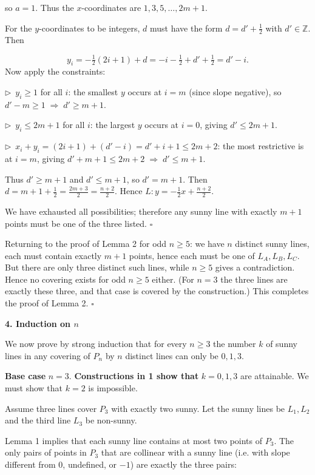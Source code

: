 \documentclass{llmxive}
\providecommand{\solutionheading}[1]{\par\smallskip\noindent\textbf{#1}\par}
\providecommand{\compactbullet}[1]{\par\noindent$\triangleright$~#1\par}
\begin{document}
so \(a = 1\). Thus the \(x\)-coordinates are \(1,3,5,\dots,2m+1\).\par
For the \(y\)-coordinates to be integers, \(d\) must have the form \(d = d' + \tfrac12\) with \(d' \in \mathbb Z\). Then\par
\[
y_i = -\tfrac12(2i+1) + d = -i - \tfrac12 + d' + \tfrac12 = d' - i.
\]
Now apply the constraints:\par
\compactbullet{\(y_i \ge 1\) for all \(i\): the smallest \(y\) occurs at \(i=m\) (since slope negative), so \(d' - m \ge 1 \;\Rightarrow\; d' \ge m+1\).}
\compactbullet{\(y_i \le 2m+1\) for all \(i\): the largest \(y\) occurs at \(i=0\), giving \(d' \le 2m+1\).}
\compactbullet{\(x_i + y_i = (2i+1) + (d' - i) = d' + i + 1 \le 2m+2\): the most restrictive is at \(i=m\), giving \(d' + m + 1 \le 2m+2 \;\Rightarrow\; d' \le m+1\).}
Thus \(d' \ge m+1\) and \(d' \le m+1\), so \(d' = m+1\). Then \(d = m+1 + \tfrac12 = \tfrac{2m+3}{2} = \tfrac{n+2}{2}\). Hence \(L: y = -\tfrac12 x + \tfrac{n+2}{2}\).\par
\smallskip
We have exhausted all possibilities; therefore any sunny line with exactly \(m+1\) points must be one of the three listed. \(\square\)\par
Returning to the proof of Lemma 2 for odd \(n\ge 5\): we have \(n\) distinct sunny lines, each must contain exactly \(m+1\) points, hence each must be one of \(L_A, L_B, L_C\). But there are only three distinct such lines, while \(n \ge 5\) gives a contradiction. Hence no covering exists for odd \(n\ge 5\) either. (For \(n=3\) the three lines are exactly these three, and that case is covered by the construction.) This completes the proof of Lemma 2. \(\square\)\par
\smallskip
\solutionheading{4. Induction on \(n\)}
We now prove by strong induction that for every \(n\ge 3\) the number \(k\) of sunny lines in any covering of \(P_n\) by \(n\) distinct lines can only be \(0,1,3\).\par
\textbf{Base case }\(n = 3\).\textbf{ Constructions in 1 show that }\(k = 0,1,3\) are attainable. We must show that \(k = 2\) is impossible.\par
Assume three lines cover \(P_3\) with exactly two sunny. Let the sunny lines be \(L_1, L_2\) and the third line \(L_3\) be non-sunny.\par
Lemma 1 implies that each sunny line contains at most two points of \(P_3\). The only pairs of points in \(P_3\) that are collinear with a sunny line (i.e. with slope different from \(0\), undefined, or \(-1\)) are exactly the three pairs:\par
\end{document}
